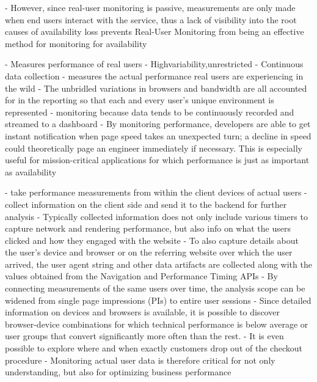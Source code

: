- However, since real-user monitoring is passive, measurements are only made when end users interact with the service, thus a lack of visibility into the root causes of availability loss prevents Real-User Monitoring from being an effective method for monitoring for availability





- Measures performance of real users
- Highvariability,unrestricted
- Continuous data collection
- measures the actual performance real users are experiencing in the wild
- The unbridled variations in browsers and bandwidth are all accounted for in the reporting so that each and every user’s unique environment is represented
- monitoring because data tends to be continuously recorded and streamed to a dashboard
- By monitoring performance, developers are able to get instant notification when page speed takes an unexpected turn; a decline in speed could theoretically page an engineer immediately if necessary. This is especially useful for mission-critical applications for which performance is just as important as availability



- take performance measurements from within the client devices of actual users
- collect information on the client side and send it to the backend for further analysis
- Typically collected information does not only include various timers to capture network and rendering performance, but also info on what the users clicked and how they engaged with the website
- To also capture details about the user’s device and browser or on the referring website over which the user arrived, the user agent string and other data artifacts are collected along with the values obtained from the Navigation and Performance Timing APIs
- By connecting measurements of the same users over time, the analysis scope can be widened from single page impressions (PIs) to entire user sessions
- Since detailed information on devices and browsers is available, it is possible to discover browser-device combinations for which technical performance is below average or user groups that convert significantly more often than the rest.
- It is even possible to explore where and when exactly customers drop out of the checkout procedure
- Monitoring actual user data is therefore critical for not only understanding, but also for optimizing business performance

